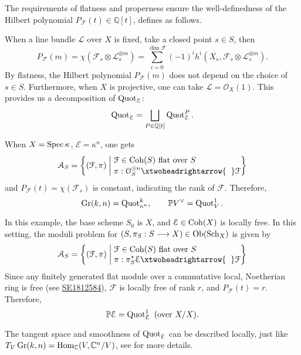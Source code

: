 \begin{remark}
The requirements of flatness and properness ensure the well-definedness of the Hilbert polynomial $P_{\mathcal{F}}(t) \in \mathbb{Q}[t]$, defines as follows.

When a line bundle $\mathcal{L}$ over $X$ is fixed, take a closed point $s \in S$, then 
$$P_{\mathcal{F}}(m) = \chi(\mathcal{F}_s \otimes \mathcal{L}_s^{\otimes m}) = \sum_{i=0}^{\dim \mathcal{F}} (-1)^i h^i (X_s, \mathcal{F}_s \otimes \mathcal{L}_s^{\otimes m}).$$
 By flatness,  the Hilbert polynomial $P_{\mathcal{F}}(m)$ does not depend on the choice of $s \in S$. Furthermore, when $X$ is projective, one can take $\mathcal{L} = \mathcal{O}_X(1)$. This provides us a decomposition of $\operatorname{Quot}_{\mathcal{E}}$:
 $$\operatorname{Quot}_{\mathcal{E}} = \bigsqcup_{P \in \mathbb{Q}[t]} \operatorname{Quot}_{\mathcal{E}}^P.$$
\end{remark}

\begin{eg}
When $X= \operatorname{Spec} \kappa$, $\mathcal{E}= \kappa^n$, one gets
$$\mathcal{A}_S=\left\{(\mathcal{F},\pi)  \;\middle|\; \begin{aligned}
&\\[-5mm]
&\mathcal{F} \in \Coh(S) \text{ flat over $S$ }\\[-1mm]
& \pi:\mathcal{O}_S^{\oplus n} \xtwoheadrightarrow{\hspace{2mm}}  \mathcal{F}
\end{aligned}
 \right\}$$
 and $P_{\mathcal{F}}(t)= \chi (\mathcal{F}_s)$ is constant, indicating the rank of $\mathcal{F}$. Therefore,
 $$\operatorname{Gr}(k,n) = \operatorname{Quot}_{\kappa^n}^{k}, \qquad \mathbb{P}V^{\vee}= \operatorname{Quot}_V^{1}.$$
\end{eg}

\begin{eg}
In this example, the base scheme $S_0$ is $X$, and $\mathcal{E} \in \operatorname{Coh}(X)$ is locally free. In this setting, the moduli problem for $(S,\pi_S: S \longrightarrow X) \in \operatorname{Ob}(\operatorname{Sch}_{X})$ is given by
$$\mathcal{A}_S=\left\{(\mathcal{F},\pi)  \;\middle|\; \begin{aligned}
&\\[-5mm]
&\mathcal{F} \in \Coh(S) \text{ flat over $S$ }\\[-1mm]
& \pi:\pi_S^*\mathcal{E} \xtwoheadrightarrow{\hspace{2mm}}  \mathcal{F}
\end{aligned}
 \right\}$$
 Since any finitely generated flat module over a commutative local, Noetherian ring is free (see \href{https://math.stackexchange.com/questions/1812584/finitely-generated-flat-modules-over-a-commutative-local-noetherian-ring-are-f}{SE1812584}),
 $\mathcal{F}$ is locally free of rank $r$, and $P_{\mathcal{F}}(t)=r$. Therefore,
 $$\mathbb{P}\mathcal{E} = \operatorname{Quot}_{\mathcal{E}}^{1} \text{ (over $X/X$)}.$$
\end{eg}
\begin{remark}
The tangent space and smoothness of $\operatorname{Quot}_{\mathcal{E}}$ can be described locally, just like $T_V \operatorname{Gr}(k,n) = \operatorname{\operatorname{Hom}}_{\mathbb{C}}(V, \mathbb{C}^n/V)$, see \cite[II.1.3]{Huy23} for more details.
\end{remark}

